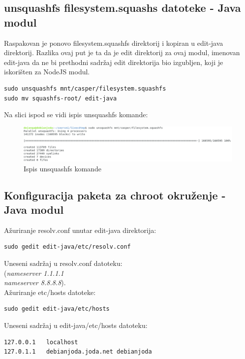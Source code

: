 \documentclass[12pt,vi]{mitthesis}
\begin{document}
\subsection*{unsquashfs filesystem.squashs datoteke - Java modul}
\indent
Raspakovan je ponovo filesystem.squashfs direktorij i kopiran u edit-java direktorij. Razlika ovaj put je ta da je edit direktorij za ovaj modul, imenovan edit-java da ne bi  prethodni sadržaj edit direktorija bio izgubljen, koji je iskorišten za NodeJS modul.\\
\begin{lstlisting}[style=BashInputStyle]
sudo unsquashfs mnt/casper/filesystem.squashfs
sudo mv squashfs-root/ edit-java
\end{lstlisting}
Na slici ispod se vidi ispis unsquashfs komande:
\begin{figure}[!htb]
\centering
\includegraphics[width=\linewidth]{images/unsquashfscommand.png}
\caption{Ispis unsquashfs komande}
\end{figure}
\subsection*{Konfiguracija paketa za chroot okruženje - Java modul}
\noindent
Ažuriranje resolv.conf unutar edit-java direktorija:
\begin{lstlisting}[style=BashInputStyle]
sudo gedit edit-java/etc/resolv.conf
\end{lstlisting}
Uneseni sadržaj u resolv.conf datoteku:\\
(\textit{nameserver 1.1.1.1 \\
nameserver 8.8.8.8}).\\
\noindent
Ažuriranje etc/hosts datoteke:
\begin{lstlisting}[style=BashInputStyle]
sudo gedit edit-java/etc/hosts
\end{lstlisting}
Uneseni sadržaj u edit-java/etc/hosts datoteku:
\begin{lstlisting}
127.0.0.1	localhost
127.0.1.1	debianjoda.joda.net	debianjoda
\end{lstlisting}
\end{document}

